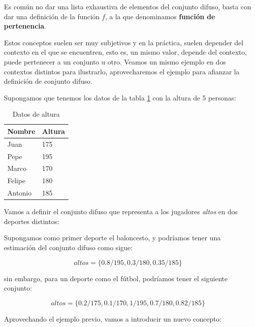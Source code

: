 Es común no dar una lista exhaustiva de elementos del conjunto difuso, basta con dar una definición de la función $f$, a la que denominamos \textbf{función de pertenencia}.

Estos conceptos suelen ser muy subjetivos y en la práctica, suelen depender del contexto en el que se encuentren, esto es, un mismo valor, depende del contexto, puede pertenecer a un conjunto u otro. Veamos un mismo ejemplo en dos contextos distintos para ilustrarlo, aprovecharemos el ejemplo para afianzar la definición de conjunto difuso.

\begin{example}
Supongamos que tenemos los datos de la tabla \ref{datatable} con la altura de 5 personas:

\begin{table}[h]
\centering
\begin{tabular}{|l|l|}
\hline
\textbf{Nombre} & \textbf{Altura} \\ \hline
Juan            & 175             \\ \hline
Pepe            & 195             \\ \hline
Marco           & 170             \\ \hline
Felipe          & 180             \\ \hline
Antonio         & 185             \\ \hline
\end{tabular}
\caption{Datos de altura}
\label{datatable}
\end{table}

Vamos a definir el conjunto difuso que representa a los jugadores \textit{altos} en dos deportes distintos:

Supongamos como primer deporte el baloncesto, y podríamos tener una estimación del conjunto difuso como sigue:

\begin{equation*}
    altos = \{ \num{0.8}/195, \num{0.3}/180, \num{0.35}/185\}
\end{equation*}

sin embargo, para un deporte como el fútbol, podríamos tener el siguiente conjunto:

\begin{equation*}
    altos = \{\num{0.2}/175, \num{0.1}/170, 1/195, \num{0.7}/180, \num{0.82}/185\}
\end{equation*}

\end{example}

Aprovechando el ejemplo previo, vamos a introducir un nuevo concepto:

